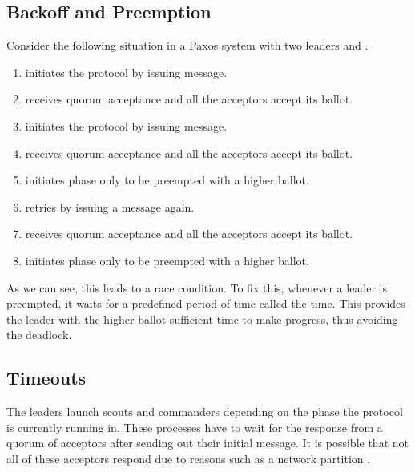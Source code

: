 \subsection{Backoff and Preemption}

Consider the following situation in a Paxos system with two leaders 
and .

\begin{enumerate}
  \item {} initiates the protocol by issuing  message.
  \item {} receives quorum acceptance and all the acceptors accept its
    ballot.
  \item {} initiates the protocol by issuing  message.
  \item {} receives quorum acceptance and all the acceptors accept its
    ballot.
  \item {} initiates  phase only to be preempted with a higher
    ballot.
  \item {} retries by issuing a  message again.
  \item {} receives quorum acceptance and all the acceptors accept its
    ballot.
  \item {} initiates  phase only to be preempted with a higher
    ballot.
\end{enumerate}

As we can see, this leads to a race condition. To
fix this, whenever a leader is preempted, it waits for a predefined period of
time called the  time. This provides the leader with the higher
ballot sufficient time to make progress, thus avoiding the deadlock.

\subsection{Timeouts}

The leaders launch scouts and commanders depending on the phase the protocol
is currently running in. These processes have to wait for the response from
a quorum of acceptors after sending out their initial message. It is possible
that not all of these acceptors respond due to reasons such as a network
partition%
.


